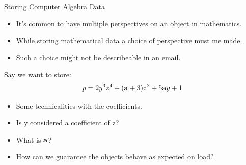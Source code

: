 \documentclass[9pt]{beamer}
\theoremstyle{definition}
\begin{document}

\begin{frame}[fragile]{Storing Computer Algebra Data}
  \begin{itemize}
    \item It's common to have multiple perspectives on an object in mathematics. 
    \item While storing mathematical data a choice of perspective must me made.
    \item Such a choice might not be describeable in an email.
    \end{itemize}

  Say we want to store:
  \begin{align*}
    p = 2y^3z^4 + (\bold{a} + 3)z^2 + 5\bold{a}y + 1
  \end{align*} \pause

  \begin{itemize}
  \item Some technicalities with the coefficients.
  \item Is y considered a coefficient of z?
  \item What is $\bold{a}$?
  \item How can we guarantee the objects behave as expected on load?
  \end{itemize}
\end{frame}

\end{document}
